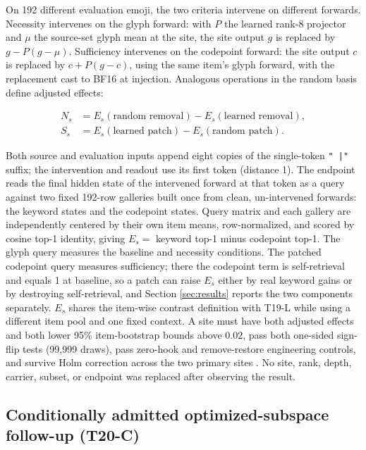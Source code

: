 \documentclass{article}
\begin{document}
On 192 different evaluation emoji, the two criteria intervene on different
forwards. Necessity intervenes on the glyph forward: with $P$ the learned
rank-8 projector and $\mu$ the source-set glyph mean at the site, the site
output $g$ is replaced by $g-P(g-\mu)$. Sufficiency intervenes on the
codepoint forward: the site output $c$ is replaced by $c+P(g-c)$, using the
same item's glyph forward, with the replacement cast to BF16 at injection.
Analogous operations in the random basis define adjusted effects:

\begin{align}
N_s &= E_s(\text{random removal})-E_s(\text{learned removal}),\\
S_s &= E_s(\text{learned patch})-E_s(\text{random patch}).
\end{align}

Both source and evaluation inputs append eight copies of the single-token
\texttt{" |"} suffix; the intervention and readout use its first token
(distance 1). The endpoint reads the final hidden state of the intervened
forward at that token as a query against two fixed 192-row galleries built
once from clean, un-intervened forwards: the keyword states and the codepoint
states. Query matrix and each gallery are independently centered by their own
item means, row-normalized, and scored by cosine top-1 identity, giving
$E_s=$ keyword top-1 minus codepoint top-1. The glyph query measures the
baseline and necessity conditions. The patched codepoint query measures
sufficiency; there the codepoint term is self-retrieval and equals 1 at
baseline, so a patch can raise $E_s$ either by real keyword gains or by
destroying self-retrieval, and Section \ref{sec:results} reports the two
components separately. $E_s$ shares the item-wise contrast definition with
T19-L while using a different item pool and one fixed context. A site must
have both adjusted effects and both lower 95\%
item-bootstrap bounds above $0.02$, pass both one-sided sign-flip tests
(99,999 draws), pass zero-hook and remove-restore engineering controls, and
survive Holm correction across the two primary sites
\citep{holm1979sequential}. No site, rank, depth, carrier, subset, or endpoint
was replaced after observing the result.

\subsection{Conditionally admitted optimized-subspace follow-up (T20-C)}
\label{sec:t20}
\end{document}
